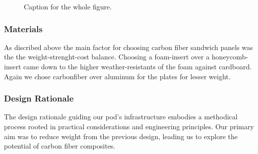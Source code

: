\begin{figure}[ht]
  \centering
  \caption{Caption for the whole figure.}
  \label{fig:test}
\end{figure}



\subsubsection{Materials}

As discribed above the main factor for choosing carbon fiber sandwich panels was the the weight-strenght-cost balance. Choosing a foam-insert over a honeycomb-insert came down to the higher weather-resistants of the foam against cardboard. Again we chose carbonfiber over aluminum for the plates for lesser weight.


\subsubsection{Design Rationale}

The design rationale guiding our pod's infrastructure embodies a methodical process rooted in practical considerations and engineering principles. Our primary aim was to reduce weight from the previous design, leading us to explore the potential of carbon fiber composites.

